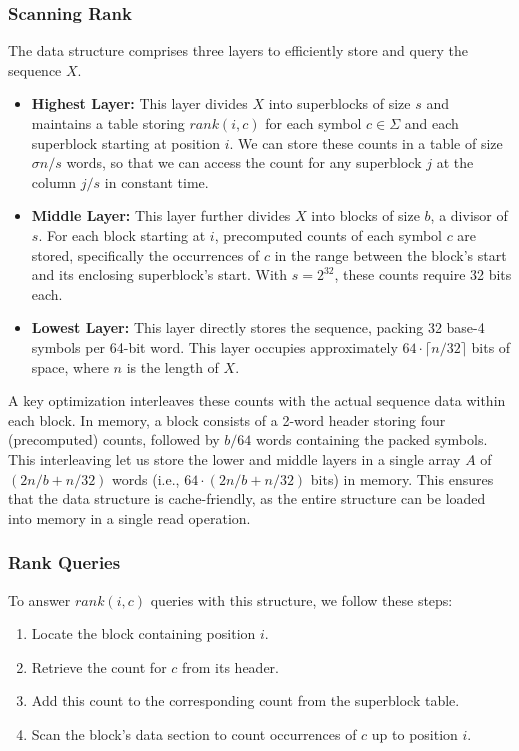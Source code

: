 \subsubsection{Scanning Rank}

The data structure comprises three layers to efficiently store and query the sequence \(X\).


\begin{itemize}
    \item \textbf{Highest Layer:} This layer divides \(X\) into superblocks of size \(s\) and maintains a table storing $rank(i,c)$ for each symbol $c \in \Sigma$ and each superblock starting at position \(i\). We can store these counts in a table of size $\sigma n / s$ words, so that we can access the count for any superblock $j$ at the column $j/s$ in constant time.
    \item \textbf{Middle Layer:} This layer further divides \(X\) into blocks of size \(b\), a divisor of \(s\). For each block starting at \(i\), precomputed counts of each symbol \(c\) are stored, specifically the occurrences of \(c\) in the range between the block's start and its enclosing superblock's start. With \(s=2^{32}\), these counts require 32 bits each.
    \item \textbf{Lowest Layer:} This layer directly stores the sequence, packing 32 base-4 symbols per 64-bit word. This layer occupies approximately $64 \cdot \lceil n/32 \rceil$ bits of space, where \(n\) is the length of \(X\).
\end{itemize}

\noindent A key optimization interleaves these counts with the actual sequence data within each block. In memory, a block consists of a 2-word header storing four (precomputed) counts, followed by \(b/64\) words containing the packed symbols. This interleaving let us store the lower and middle layers in a single array $A$ of $(2n/b + n/32)$ words (i.e., $64 \cdot (2n/b + n/32)$ bits) in memory. This ensures that the data structure is cache-friendly, as the entire structure can be loaded into memory in a single read operation.

\subsubsection*{Rank Queries}

\noindent To answer \(rank(i,c)\) queries with this structure, we follow these steps:
\begin{enumerate}
    \item Locate the block containing position \(i\).
    \item Retrieve the count for \(c\) from its header.
    \item Add this count to the corresponding count from the superblock table.
    \item Scan the block's data section to count occurrences of \(c\) up to position \(i\).
\end{enumerate}

